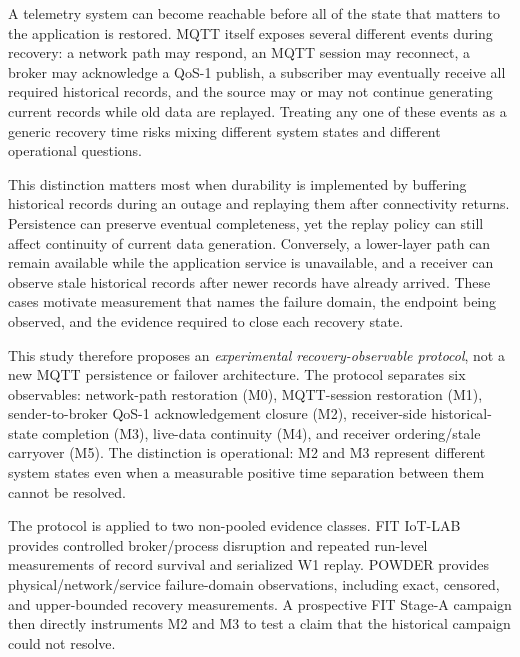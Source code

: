 \documentclass[journal]{IEEEtran}
\begin{document}
A telemetry system can become reachable before all of the state that matters to the application is restored. MQTT itself exposes several different events during recovery: a network path may respond, an MQTT session may reconnect, a broker may acknowledge a QoS-1 publish, a subscriber may eventually receive all required historical records, and the source may or may not continue generating current records while old data are replayed. Treating any one of these events as a generic recovery time risks mixing different system states and different operational questions.

This distinction matters most when durability is implemented by buffering historical records during an outage and replaying them after connectivity returns. Persistence can preserve eventual completeness, yet the replay policy can still affect continuity of current data generation. Conversely, a lower-layer path can remain available while the application service is unavailable, and a receiver can observe stale historical records after newer records have already arrived. These cases motivate measurement that names the failure domain, the endpoint being observed, and the evidence required to close each recovery state.

This study therefore proposes an \emph{experimental recovery-observable protocol}, not a new MQTT persistence or failover architecture. The protocol separates six observables: network-path restoration (M0), MQTT-session restoration (M1), sender-to-broker QoS-1 acknowledgement closure (M2), receiver-side historical-state completion (M3), live-data continuity (M4), and receiver ordering/stale carryover (M5). The distinction is operational: M2 and M3 represent different system states even when a measurable positive time separation between them cannot be resolved.

The protocol is applied to two non-pooled evidence classes. FIT IoT-LAB provides controlled broker/process disruption and repeated run-level measurements of record survival and serialized W1 replay. POWDER provides physical/network/service failure-domain observations, including exact, censored, and upper-bounded recovery measurements. A prospective FIT Stage-A campaign then directly instruments M2 and M3 to test a claim that the historical campaign could not resolve.
\end{document}
